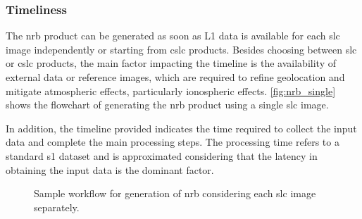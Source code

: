 \subsubsection{Timeliness}
\label{sec:nrb_timeliness}

The \acs{nrb} product can be generated as soon as L1 data is available for each \acs{slc} image independently or starting from \acs{cslc} products. Besides choosing between \acs{slc} or \acs{cslc} products, the main factor impacting the timeline is the availability of external data or reference images, which are required to refine geolocation and mitigate atmospheric effects, particularly ionospheric effects. \autoref{fig:nrb_single} shows the flowchart of generating the \acs{nrb} product using a single \acs{slc} image.

In addition, the timeline provided indicates the time required to collect the input data and complete the main processing steps. The processing time refers to a standard \acs{s1} dataset and is approximated considering that the latency in obtaining the input data is the dominant factor.

\begin{figure}[H]
		\centering
		\caption{Sample workflow for generation of \acs{nrb} considering each \acs{slc} image separately.}
		\label{fig:nrb_single}
\end{figure}
	
